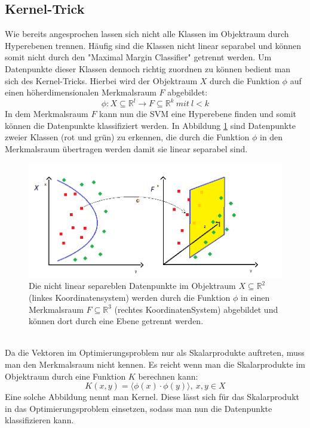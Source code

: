 \subsection{Kernel-Trick}
\label{subsec:kernel-trick}
Wie bereits angesprochen lassen sich nicht alle Klassen im Objektraum durch Hyperebenen trennen. Häufig sind die Klassen nicht linear separabel und können somit nicht durch den "Maximal Margin Classifier" getrennt werden. Um Datenpunkte dieser Klassen dennoch richtig zuordnen zu können bedient man sich des Kernel-Tricks. Hierbei wird der Objektraum $X$ durch die Funktion $\phi$ auf einen höherdimensionalen Merkmalsraum $F$ abgebildet:
\[\phi : X \subseteq \mathbb{R}^l \rightarrow F \subseteq \mathbb{R}^k\ mit\ l<k \]
In dem Merkmalsraum $F$ kann nun die SVM eine Hyperebene finden und somit können die Datenpunkte klassifiziert werden. In Abbildung \ref{fig:Objektraum-Merkmalsraum} sind Datenpunkte zweier Klassen (rot und grün) zu erkennen, die durch die Funktion $\phi$ in den Merkmalsraum übertragen werden damit sie linear separabel sind.\\
\begin{figure}[hbtp]
\includegraphics[width=1.0\linewidth]{ObjektZuMerkmalsRaum.png}
\caption{Die nicht linear separeblen Datenpunkte im Objektraum $X \subseteq \mathbb{R}^2$ (linkes Koordinatensystem) werden durch die Funktion $\phi$ in einen Merkmalsraum $F\subseteq \mathbb{R}^3$ (rechtes KoordinatenSystem) abgebildet und können dort durch eine Ebene getrennt werden.}
\label{fig:Objektraum-Merkmalsraum}
\end{figure}\\
Da die Vektoren im Optimierungsproblem nur als Skalarprodukte auftreten, muss man den Merkmalsraum nicht kennen. Es reicht wenn man die Skalarprodukte im Objektraum durch eine Funktion $K$ berechnen kann:
\[K(x,y) = \langle \phi(x) \cdot \phi(y) \rangle,\ x,y \in X\]
Eine solche Abbildung nennt man Kernel. Diese lässt sich für das Skalarprodukt in das Optimierungsproblem einsetzen, sodass man nun die Datenpunkte klassifizieren kann.\cite{laechele-svm,sayad-svm}


